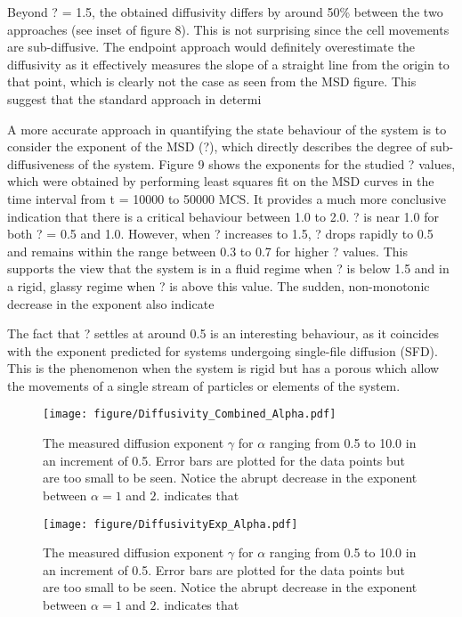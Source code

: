 \documentclass[a4paper,12pt]{article}
\begin{document}
Beyond ? = 1.5, the obtained diffusivity differs by around 50\% between the two approaches (see inset of figure 8). This is not surprising since the cell movements are sub-diffusive. The endpoint approach would definitely overestimate the diffusivity as it effectively measures the slope of a straight line from the origin to that point, which is clearly not the case as seen from the MSD figure. This suggest that the standard approach in determi

A more accurate approach in quantifying the state behaviour of the system is to consider the exponent of the MSD (?), which directly describes the degree of sub-diffusiveness of the system. Figure 9 shows the exponents for the studied ? values, which were obtained by performing least squares fit on the MSD curves in the time interval from t = 10000 to 50000 MCS. It provides a much more conclusive indication that there is a critical behaviour between 1.0 to 2.0. ? is near 1.0 for both ? = 0.5 and 1.0. However, when ? increases to 1.5, ? drops rapidly to 0.5 and remains within the range between 0.3 to 0.7 for higher ? values. This supports the view that the system is in a fluid regime when ? is below 1.5 and in a rigid, glassy regime when ? is above this value. The sudden, non-monotonic decrease in the exponent also indicate 

The fact that ? settles at around 0.5 is an interesting behaviour, as it coincides with the exponent predicted for systems undergoing single-file diffusion (SFD). This is the phenomenon when the system is rigid but has a porous which allow the movements of a single stream of particles or elements of the system. 
\begin{figure}[h]
\centering
\texttt{[image: figure/Diffusivity\_Combined\_Alpha.pdf]}
\caption{The measured diffusion exponent $\gamma$ for $\alpha$ ranging from 0.5 to 10.0 in an increment of 0.5. Error bars are plotted for the data points but are too small to be seen. Notice the abrupt decrease in the exponent between $\alpha = 1$ and $2$.  indicates that }
\end{figure}
\FloatBarrier

\begin{figure}[h]
\centering
\texttt{[image: figure/DiffusivityExp\_Alpha.pdf]}
\caption{The measured diffusion exponent $\gamma$ for $\alpha$ ranging from 0.5 to 10.0 in an increment of 0.5. Error bars are plotted for the data points but are too small to be seen. Notice the abrupt decrease in the exponent between $\alpha = 1$ and $2$.  indicates that }
\end{figure}
\FloatBarrier
\end{document}
